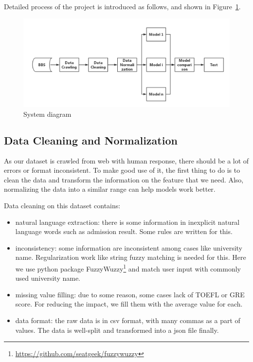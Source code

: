 \documentclass{article}
\begin{document}
Detailed process of the project is introduced as follows, and shown in Figure~\ref{fig: Diagram}.

\begin{figure}[htbp]
\centering
\includegraphics[width = 14cm]{Diagram}
\caption{System diagram}
\label{fig: Diagram}
\end{figure}

\subsection{Data Cleaning and Normalization}

As our dataset is crawled from web with human response, there should be a lot of errors or format inconsistent. To make good use of it, the first thing to do is to clean the data and transform the information on the feature that we need. Also, normalizing the data into a similar range can help models work better.

Data cleaning on this dataset contains:

\begin{itemize}
    \item natural language extraction: there is some information in inexplicit natural language words such as admission result. Some rules are written for this.
    \item inconsistency: some information are inconsistent among cases like university name. Regularization work like string fuzzy matching is needed for this. Here we use python package FuzzyWuzzy\footnote{\url{https://github.com/seatgeek/fuzzywuzzy}} and match user input with commonly used university name.
    \item missing value filling: due to some reason, some cases lack of TOEFL or GRE score. For reducing the impact, we fill them with the average value for each.
    \item data format: the raw data is in csv format, with many commas as a part of values. The data is well-split and transformed into a json file finally.
\end{itemize}
\end{document}
